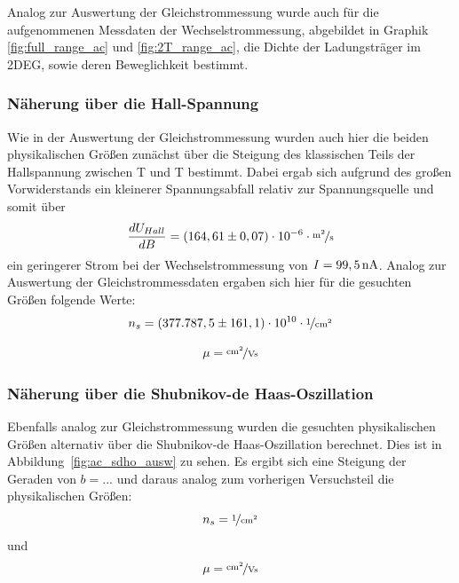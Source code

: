 

Analog zur Auswertung der Gleichstrommessung wurde auch für die aufgenommenen Messdaten der Wechselstrommessung, abgebildet in Graphik \ref{fig:full_range_ac} und \ref{fig:2T_range_ac}, die Dichte der Ladungsträger im 2DEG, sowie deren Beweglichkeit bestimmt.

\subsubsection{Näherung über die Hall-Spannung}
\label{ch:naeherung_hall2}

Wie in der Auswertung der Gleichstrommessung wurden auch hier die beiden physikalischen Größen zunächst über die Steigung des klassischen Teils der Hallspannung zwischen \unit[-2]{T} und \unit[2]{T} bestimmt. Dabei ergab sich aufgrund des großen Vorwiderstands ein kleinerer Spannungsabfall relativ zur Spannungsquelle und somit über
\begin{equation}
	\d{U_{Hall}}{B} = ( 164,61 \pm 0,07 ) \cdot 10^{-6} \cdot \unitfrac{m^2}{s}
\end{equation}
ein geringerer Strom bei der Wechselstrommessung von $I=\unit[99,5]{nA}$. Analog zur Auswertung der Gleichstrommessdaten ergaben sich hier für die gesuchten Größen folgende Werte: 
\begin{equation}
n_s=  ( 377.787,5 \pm 161,1) \cdot 10^{10} \cdot \unitfrac{1}{cm^2}
\end{equation}

\begin{equation}
\mu= \unitfrac{cm^2}{Vs}   %
\end{equation}
 


\subsubsection{Näherung über die Shubnikov-de Haas-Oszillation}
\label{ch:naeherung_ac}

Ebenfalls analog zur Gleichstrommessung wurden die gesuchten physikalischen Größen alternativ über die Shubnikov-de Haas-Oszillation berechnet. Dies ist in Abbildung~\ref{fig:ac_sdho_ausw} zu sehen. 
Es ergibt sich eine Steigung der Geraden von $b=...$  %
und daraus analog zum vorherigen Versuchsteil die physikalischen Größen: 
\begin{equation}
n_s= \unitfrac{1}{cm^2}  %
\end{equation}
und 
\begin{equation}
\mu= \unitfrac{cm^2}{Vs}   %
\end{equation} 
   
